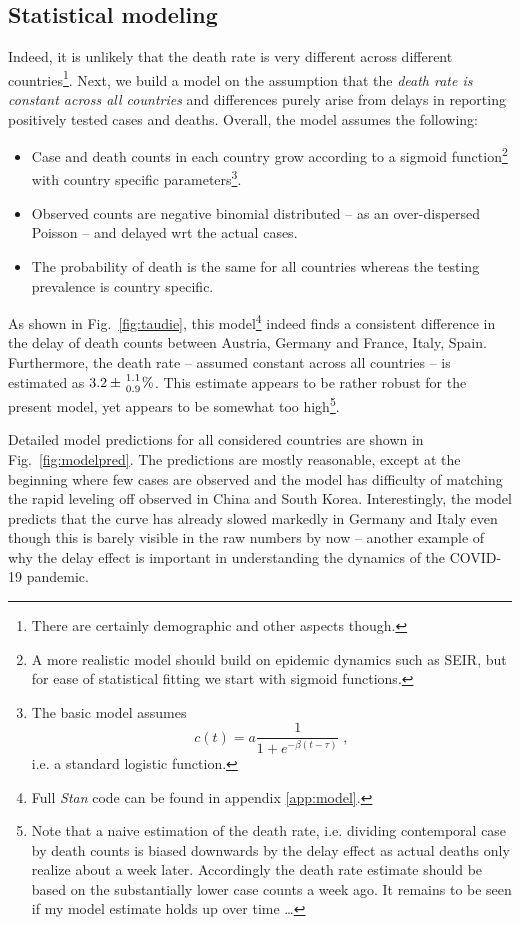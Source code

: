 \documentclass[a4paper]{tufte-handout}
\newcommand{\fig}[1]{Fig.~\ref{fig:#1}}
\begin{document}
\subsection{Statistical modeling}

Indeed, it is unlikely that the death rate is very different across
different countries\footnote{There are certainly demographic and other
  aspects though.}. Next, we build a model on the assumption that the
{\em death rate is constant across all countries} and differences
purely arise from delays in reporting positively tested cases and
deaths. Overall, the model assumes the following:
\begin{itemize}
\item Case and death counts in each country grow according to a
  sigmoid function\footnote{A more realistic model should build on
    epidemic dynamics such as SEIR, but for ease of statistical
    fitting we start with sigmoid functions.} with country specific
  parameters\footnote{The basic model assumes \[ c(t) = a \frac{1}{1 +
      e^{- \beta (t - \tau)}} \; , \] i.e. a standard logistic
    function.}.
\item Observed counts are negative binomial distributed -- as an
  over-dispersed Poisson -- and delayed wrt the actual cases.
\item The probability of death is the same for all countries whereas
  the testing prevalence is country specific.
\end{itemize}

As shown in \fig{taudie}, this model\footnote{Full {\em Stan} code can
  be found in appendix \ref{app:model}.} indeed finds a consistent
difference in the delay of death counts between Austria, Germany and
France, Italy, Spain. Furthermore, the death rate -- assumed constant
across all countries -- is estimated as $3.2 \pm {1.1 \atop 0.9}
\%$. This estimate appears to be rather robust for the present model,
yet appears to be somewhat too high\footnote{Note that a naive
  estimation of the death rate, i.e. dividing contemporal case by
  death counts is biased downwards by the delay effect as actual
  deaths only realize about a week later. Accordingly the death rate
  estimate should be based on the substantially lower case counts a
  week ago. It remains to be seen if my model estimate holds up over
  time \ldots}.

Detailed model predictions for all considered countries are shown in
\fig{modelpred}. The predictions are mostly reasonable, except at the
beginning where few cases are observed and the model has difficulty of
matching the rapid leveling off observed in China and South
Korea. Interestingly, the model predicts that the curve has already
slowed markedly in Germany and Italy even though this is barely
visible in the raw numbers by now -- another example of why the delay
effect is important in understanding the dynamics of the COVID-19
pandemic.
\end{document}
